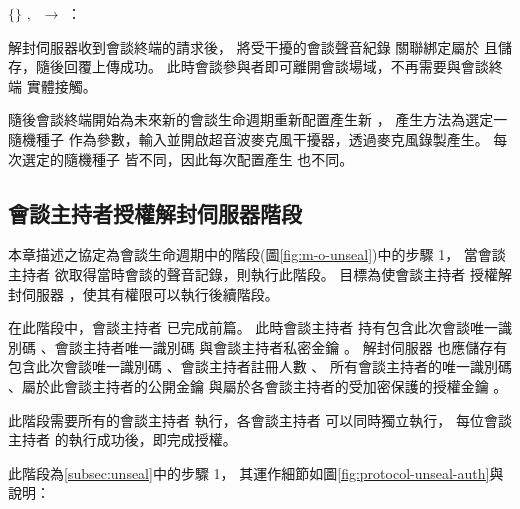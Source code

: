 \begin{pmsgs}
    \item $\{\}$ $,~$ \DEFserver $\rightarrow$ \DEFmeetingbox：

        解封伺服器收到會談終端的請求後，
    將受干擾的會談聲音紀錄 \DEFrecJ 關聯綁定屬於 \DEFsessionID 且儲存，隨後回覆上傳成功。
    此時會談參與者即可離開會談場域，不再需要與會談終端 \DEFmeetingbox 實體接觸。

        隨後會談終端開始為未來新的會談生命週期重新配置產生新 \DEFrecN，
    產生方法為選定一隨機種子 \DEFseed 作為參數，輸入並開啟超音波麥克風干擾器，透過麥克風錄製產生。
    每次選定的隨機種子 \DEFseed 皆不同，因此每次配置產生 \DEFrecN 也不同。
\end{pmsgs}


\subsection{會談主持者授權解封伺服器階段}\label{subsec:protocol-unseal-auth}

    本章描述之協定為會談生命週期中的階段(圖\ref{fig:m-o-unseal})中的步驟 1，
當會談主持者 \DEFowner 欲取得當時會談的聲音記錄，則執行此階段。
目標為使會談主持者 \DEFowner 授權解封伺服器 \DEFserver，使其有權限可以執行後續階段。

    在此階段中，會談主持者 \DEFowner 已完成前篇。
此時會談主持者 \DEFowner 持有包含此次會談唯一識別碼 \DEFsessionID、會談主持者唯一識別碼 \DEFownerID
與會談主持者私密金鑰 \DEFprivateKey。
解封伺服器 \DEFserver 也應儲存有包含此次會談唯一識別碼 \DEFsessionID、會談主持者註冊人數 \DEFowreg、
所有會談主持者的唯一識別碼 \DEFownerID、屬於此會談主持者的公開金鑰 \DEFprivateKey
與屬於各會談主持者的受加密保護的授權金鑰 \DEFakEnc。

    此階段需要所有的會談主持者 \DEFownerAll 執行，各會談主持者 \DEFowner 可以同時獨立執行，
每位會談主持者 \DEFowner 的執行成功後，即完成授權。

    此階段為\ref{subsec:unseal}中的步驟 1，
其運作細節如圖\ref{fig:protocol-unseal-auth}與說明：

